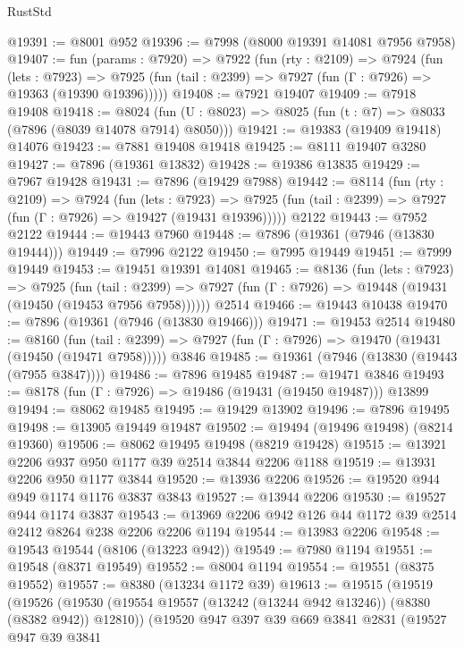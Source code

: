 \begin{lexlean}{RustStd}
\begin{coremodule}
@19391 := @8001 @952
@19396 := @7998 (@8000 @19391 @14081 @7956 @7958)
@19407 := fun (params : @7920) =>
  @7922
    (fun (rty : @2109) =>
    @7924
      (fun (lets : @7923) =>
      @7925 (fun (tail : @2399) => @7927 (fun (Γ : @7926) => @19363 (@19390 @19396)))))
@19408 := @7921 @19407
@19409 := @7918 @19408
@19418 := @8024
    (fun (U : @8023) => @8025 (fun (t : @7) => @8033 (@7896 (@8039 @14078 @7914) @8050)))
@19421 := @19383 (@19409 @19418) @14076
@19423 := @7881 @19408 @19418
@19425 := @8111 @19407 @3280
@19427 := @7896 (@19361 @13832)
@19428 := @19386 @13835
@19429 := @7967 @19428
@19431 := @7896 (@19429 @7988)
@19442 := @8114
    (fun (rty : @2109) =>
    @7924
      (fun (lets : @7923) =>
      @7925 (fun (tail : @2399) => @7927 (fun (Γ : @7926) => @19427 (@19431 @19396)))))
    @2122
@19443 := @7952 @2122
@19444 := @19443 @7960
@19448 := @7896 (@19361 (@7946 (@13830 @19444)))
@19449 := @7996 @2122
@19450 := @7995 @19449
@19451 := @7999 @19449
@19453 := @19451 @19391 @14081
@19465 := @8136
    (fun (lets : @7923) =>
    @7925
      (fun (tail : @2399) =>
      @7927 (fun (Γ : @7926) => @19448 (@19431 (@19450 (@19453 @7956 @7958))))))
    @2514
@19466 := @19443 @10438
@19470 := @7896 (@19361 (@7946 (@13830 @19466)))
@19471 := @19453 @2514
@19480 := @8160
    (fun (tail : @2399) => @7927 (fun (Γ : @7926) => @19470 (@19431 (@19450 (@19471 @7958)))))
    @3846
@19485 := @19361 (@7946 (@13830 (@19443 (@7955 @3847))))
@19486 := @7896 @19485
@19487 := @19471 @3846
@19493 := @8178 (fun (Γ : @7926) => @19486 (@19431 (@19450 @19487))) @13899
@19494 := @8062 @19485
@19495 := @19429 @13902
@19496 := @7896 @19495
@19498 := @13905 @19449 @19487
@19502 := @19494 (@19496 @19498) (@8214 @19360)
@19506 := @8062 @19495 @19498 (@8219 @19428)
@19515 := @13921 @2206 @937 @950 @1177 @39 @2514 @3844 @2206 @1188
@19519 := @13931 @2206 @950 @1177 @3844
@19520 := @13936 @2206
@19526 := @19520 @944 @949 @1174 @1176 @3837 @3843
@19527 := @13944 @2206
@19530 := @19527 @944 @1174 @3837
@19543 := @13969 @2206 @942 @126 @44 @1172 @39 @2514 @2412 @8264 @238 @2206 @2206 @1194
@19544 := @13983 @2206
@19548 := @19543 @19544 (@8106 (@13223 @942))
@19549 := @7980 @1194
@19551 := @19548 (@8371 @19549)
@19552 := @8004 @1194
@19554 := @19551 (@8375 @19552)
@19557 := @8380 (@13234 @1172 @39)
@19613 := @19515
    (@19519
      (@19526
        (@19530 (@19554 @19557 (@13242 (@13244 @942 @13246)) (@8380 (@8382 @942)) @12810))
        (@19520
          @947
          @397
          @39
          @669
          @3841
          @2831
          (@19527
            @947
            @39
            @3841

\end{coremodule}
\end{lexlean}

